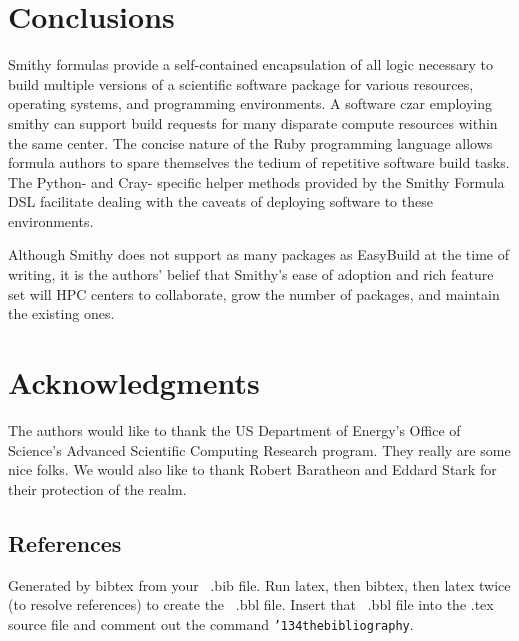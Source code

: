 \documentclass{acm_proc_article-sp}
\begin{document}
\section{Conclusions}
Smithy formulas provide a self-contained encapsulation of all logic necessary to build multiple versions of a scientific software package for various resources, operating systems, and programming environments. A software czar employing smithy can support build requests for many disparate compute resources within the same center. The concise nature of the Ruby programming language allows formula authors to spare themselves the tedium of repetitive software build tasks. The Python- and Cray- specific helper methods provided by the Smithy Formula DSL facilitate dealing with the caveats of deploying software to these environments.

Although Smithy does not support as many packages as EasyBuild at the time of writing, it is the authors' belief that Smithy's ease of adoption and rich feature set will HPC centers to collaborate, grow the number of packages, and maintain the existing ones.

\section{Acknowledgments}
The authors would like to thank the US Department of Energy's Office of Science's Advanced Scientific Computing Research program. They really are some nice folks. We would also like to thank Robert Baratheon and Eddard Stark for their protection of the realm.

%


\subsection{References}
Generated by bibtex from your ~.bib file.  Run latex,
then bibtex, then latex twice (to resolve references)
to create the ~.bbl file.  Insert that ~.bbl file into
the .tex source file and comment out
the command \texttt{{\char'134}thebibliography}.
\end{document}
